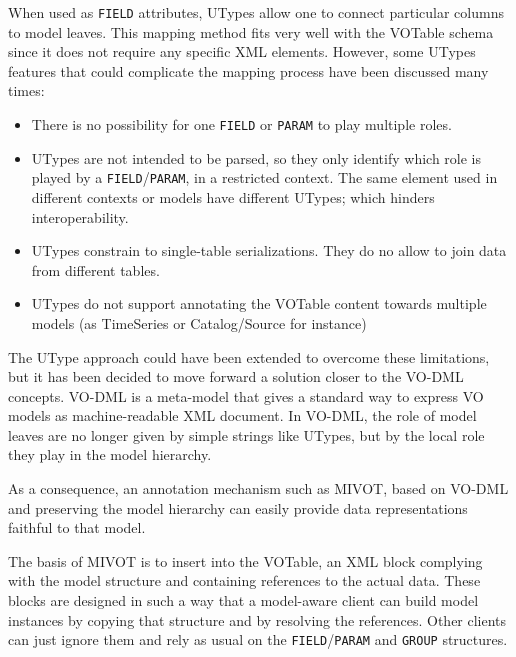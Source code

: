When used as \texttt{FIELD} attributes, UTypes allow one to connect particular columns to model leaves. This mapping method fits very well with the VOTable schema since it does not require any specific XML elements. 
However, some UTypes features that could complicate the mapping process have been discussed many times:

\begin{itemize}
  \item There is no possibility for one  \texttt{FIELD} or \texttt{PARAM} to play multiple roles.
  \item UTypes are not intended to be parsed, so they only identify which role is played by a \texttt{FIELD}/\texttt{PARAM}, 
  in a restricted context. The same element used in different contexts or models have different UTypes; which hinders interoperability.
  \item UTypes constrain to single-table serializations. They do no allow to join data from different tables. 
  \item UTypes do not support annotating the VOTable content towards multiple models 
  (as TimeSeries or Catalog/Source for instance)
\end{itemize}

The UType approach could have been extended to overcome these limitations, but it has been decided to move forward a solution closer to the VO-DML \citep{2018ivoa.spec.0910L} concepts. 
VO-DML is a meta-model that gives a standard way to express VO models as machine-readable XML document.
In VO-DML, the role of model leaves are no longer given by simple strings like UTypes, but by the local role they play in the model hierarchy.




As a consequence, an annotation mechanism such as MIVOT, based on VO-DML and preserving the model hierarchy can easily provide data representations faithful to that model.

The basis of MIVOT is to insert into the VOTable, an XML block complying with the 
model structure and containing references to the actual data.
These blocks are designed in such a way that a model-aware client can build  model instances by copying that structure and by resolving the references. 
Other clients can just ignore them and rely as usual on the \texttt{FIELD}/\texttt{PARAM} and \texttt{GROUP} structures.


